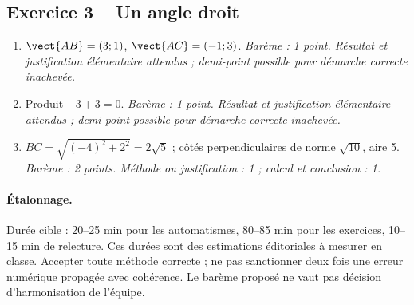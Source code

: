 \subsection*{Exercice 3 -- Un angle droit}
\begin{enumerate}
\item $\vect{AB}=(3;1)$, $\vect{AC}=(-1;3)$. \textit{Barème : 1 point. Résultat et justification élémentaire attendus ; demi-point possible pour démarche correcte inachevée.}
\item Produit $-3+3=0$. \textit{Barème : 1 point. Résultat et justification élémentaire attendus ; demi-point possible pour démarche correcte inachevée.}
\item $BC=\sqrt{(-4)^2+2^2}=2\sqrt5$ ; côtés perpendiculaires de norme $\sqrt{10}$, aire 5. \textit{Barème : 2 points. Méthode ou justification : 1 ; calcul et conclusion : 1.}
\end{enumerate}
\paragraph{Étalonnage.} Durée cible : 20–25 min pour les automatismes, 80–85 min pour les exercices, 10–15 min de relecture. Ces durées sont des estimations éditoriales à mesurer en classe. Accepter toute méthode correcte ; ne pas sanctionner deux fois une erreur numérique propagée avec cohérence. Le barème proposé ne vaut pas décision d’harmonisation de l’équipe.
